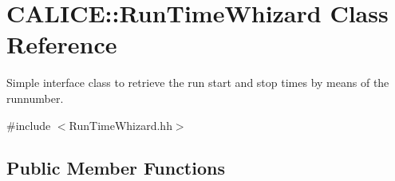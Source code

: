 \section{C\-A\-L\-I\-C\-E\-:\-:Run\-Time\-Whizard Class Reference}
\label{classCALICE_1_1RunTimeWhizard}


Simple interface class to retrieve the run start and stop times by means of the runnumber.  




{\ttfamily \#include $<$Run\-Time\-Whizard.\-hh$>$}

\subsection*{Public Member Functions}
